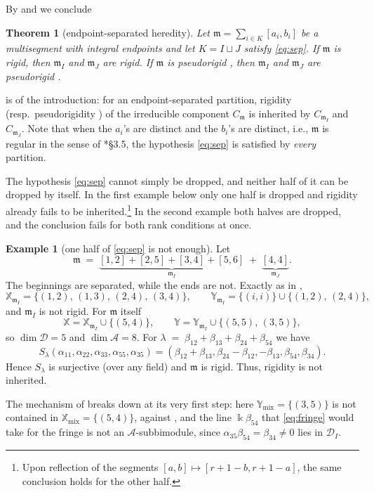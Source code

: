 \documentclass[12pt]{article}
\def\xspace{ }%
\newtheorem{theorem}{Theorem}[section]
\theoremstyle{definition}
\newtheorem{example}[example]{Example}
\newcommand{\prig}{pseudorigid\xspace}
\newcommand{\prigity}{pseudorigidity\xspace}
\newcommand{\mix}{\mathrm{mix}}   %
\newcommand{\cmp}{C}                       %
\newcommand{\mm}{\mathfrak{m}}
\newcommand{\kk}{\Bbbk}
\newcommand{\alg}{\mathcal{A}}   %
\newcommand{\bmdl}{\mathcal{D}}   %
\newcommand{\XX}{\mathbb{X}}  %
\newcommand{\YY}{\mathbb{Y}}  %
\newcommand{\Kk}{K}         %
\newcommand{\algbss}{\alpha}     %
\newcommand{\bmdlbss}{\beta}    %
\newcommand{\Sop}{S}
\begin{document}
By  and  we conclude

\begin{theorem}[endpoint-separated heredity]\label{thm:esi}
Let $\mm = \sum_{i\in \Kk}[a_i,b_i]$ be a multisegment with integral endpoints
and let $\Kk = I\sqcup J$ satisfy \eqref{eq:sep}. If $\mm$ is rigid, then
$\mm_I$ and $\mm_J$ are rigid. If $\mm$ is \prig, then $\mm_I$ and $\mm_J$ are
\prig.
\end{theorem}

 is  of the introduction: for an endpoint-separated
partition, rigidity (resp.\ \prigity) of the irreducible component $\cmp_\mm$ is
inherited by $\cmp_{\mm_I}$ and $\cmp_{\mm_J}$.
Note that when the $a_i$'s are distinct and the $b_i$'s are distinct,
i.e., $\mm$ is regular in the sense of \cite{MR3866895}*{\S3.5},
the hypothesis \eqref{eq:sep} is satisfied by \emph{every} partition.


The hypothesis \eqref{eq:sep} cannot simply be dropped, and neither half of
it can be dropped by itself. In the first example below only one half is
dropped and rigidity already fails to be inherited.\footnote{Upon reflection of the segments $[a,b] \mapsto [r+1-b,r+1-a]$,
the same conclusion holds for the other half.}
In the second example both halves are dropped, and the conclusion fails for both rank conditions at once.

\begin{example}[one half of \eqref{eq:sep} is not enough]\label{ex:half}
Let
\[
   \mm \;=\; \underbrace{[1,2]+[2,5]+[3,4]+[5,6]}_{\textstyle \mm_I}
   \;+\; \underbrace{[4,4]}_{\textstyle \mm_J}.
\]
The beginnings are separated, while the ends are not.
Exactly as in ,
\[
   \XX_{\mm_I} = \{(1,2),\,(1,3),\,(2,4),\,(3,4)\}, \qquad
   \YY_{\mm_I} = \{(i,i)\}\cup\{(1,2),\,(2,4)\} ,
\]
and $\mm_I$ is not rigid. For $\mm$ itself
\[
   \XX = \XX_{\mm_I}\cup\{(5,4)\}, \qquad
   \YY = \YY_{\mm_I}\cup\{(5,5),\,(3,5)\} ,
\]
so $\dim\bmdl = 5$ and $\dim\alg = 8$. For $\lambda \;=\; \bmdlbss_{12}+\bmdlbss_{13}+\bmdlbss_{24}+\bmdlbss_{54}$ we have
\[
   \Sop_\lambda(\algbss_{11},\algbss_{22},\algbss_{33},\algbss_{55},\algbss_{35})=
   (\bmdlbss_{12}+\bmdlbss_{13},\bmdlbss_{24}-\bmdlbss_{12},-\bmdlbss_{13},\bmdlbss_{54},\bmdlbss_{34}).
\]
Hence $\Sop_\lambda$ is surjective (over any field) and $\mm$ is rigid. Thus, rigidity is not inherited.

The mechanism of  breaks down at its very first step:
here $\YY_{\mix} = \{(3,5)\}$ is not contained in $\XX_{\mix} =
\{(5,4)\}$, against , and the line
$\kk\bmdlbss_{54}$ that \eqref{eq:fringe} would take for the fringe is not
an $\alg$-subbimodule, since $\algbss_{35}\bmdlbss_{54} = \bmdlbss_{34}
\ne 0$ lies in $\bmdl_I$.
\end{example}
\end{document}
